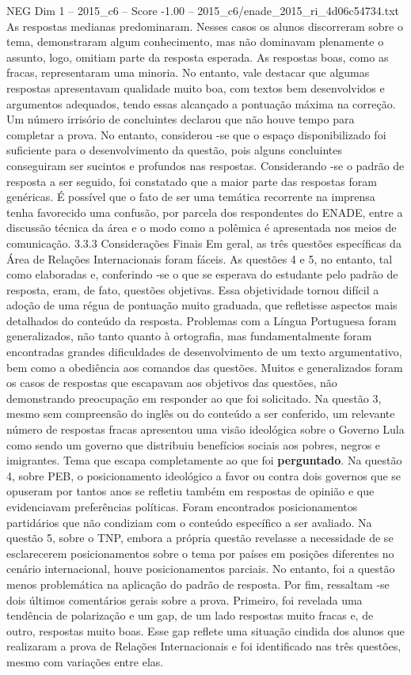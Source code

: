 \begin{textsample}{NEG Dim 1 – 2015\_c6 – Score -1.00 – 2015\_c6/enade\_2015\_ri\_4d06c54734.txt}
As respostas medianas predominaram.
Nesses casos os alunos discorreram sobre o tema, demonstraram algum conhecimento, mas não dominavam plenamente o assunto, logo, omitiam parte da resposta esperada.
As respostas boas, como as fracas, representaram uma minoria.
No entanto, vale destacar que algumas respostas apresentavam qualidade muito boa, com textos bem desenvolvidos e argumentos adequados, tendo essas alcançado a pontuação máxima na correção.
Um número irrisório de concluintes declarou que não houve tempo para completar a prova.
No entanto, considerou -se que o espaço disponibilizado foi suficiente para o desenvolvimento da questão, pois alguns concluintes conseguiram ser sucintos e profundos nas respostas.
Considerando -se o padrão de resposta a ser seguido, foi constatado que a maior parte das respostas foram genéricas.
É possível que o fato de ser uma temática recorrente na imprensa tenha favorecido uma confusão, por parcela dos respondentes do ENADE, entre a discussão técnica da área e o modo como a polêmica é apresentada nos meios de comunicação. 3.3.3 Considerações Finais Em geral, as três questões específicas da Área de Relações Internacionais foram fáceis.
As questões 4 e 5, no entanto, tal como elaboradas e, conferindo -se o que se esperava do estudante pelo padrão de resposta, eram, de fato, questões objetivas.
Essa objetividade tornou difícil a adoção de uma régua de pontuação muito graduada, que refletisse aspectos mais detalhados do conteúdo da resposta.
Problemas com a Língua Portuguesa foram generalizados, não tanto quanto à ortografia, mas fundamentalmente foram encontradas grandes dificuldades de desenvolvimento de um texto argumentativo, bem como a obediência aos comandos das questões.
Muitos e generalizados foram os casos de respostas que escapavam aos objetivos das questões, não demonstrando preocupação em responder ao que foi solicitado.
Na questão 3, mesmo sem compreensão do inglês ou do conteúdo a ser conferido, um relevante número de respostas fracas apresentou uma visão ideológica sobre o Governo Lula como sendo um governo que distribuiu benefícios sociais aos pobres, negros e imigrantes.
Tema que escapa completamente ao que foi \textbf{perguntado}.
Na questão 4, sobre PEB, o posicionamento ideológico a favor ou contra dois governos que se opuseram por tantos anos se refletiu também em respostas de opinião e que evidenciavam preferências políticas.
Foram encontrados posicionamentos partidários que não condiziam com o conteúdo específico a ser avaliado.
Na questão 5, sobre o TNP, embora a própria questão revelasse a necessidade de se esclarecerem posicionamentos sobre o tema por países em posições diferentes no cenário internacional, houve posicionamentos parciais.
No entanto, foi a questão menos problemática na aplicação do padrão de resposta.
Por fim, ressaltam -se dois últimos comentários gerais sobre a prova.
Primeiro, foi revelada uma tendência de polarização e um gap, de um lado respostas muito fracas e, de outro, respostas muito boas.
Esse gap reflete uma situação cindida dos alunos que realizaram a prova de Relações Internacionais e foi identificado nas três questões, mesmo com variações entre elas.

\end{textsample}
